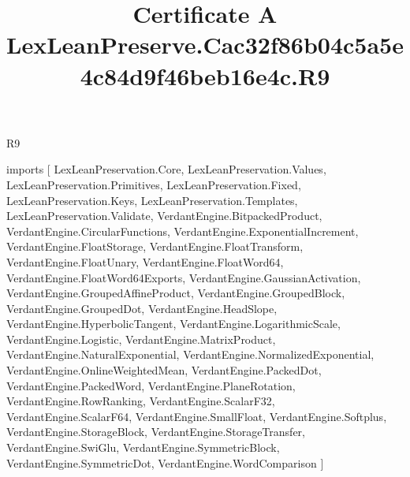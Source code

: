 \begin{lexlean}{R9}
\title{Certificate A LexLeanPreserve.Cac32f86b04c5a5e4c84d9f46beb16e4c.R9}
\begin{coremodule}
imports [
  LexLeanPreservation.Core,
  LexLeanPreservation.Values,
  LexLeanPreservation.Primitives,
  LexLeanPreservation.Fixed,
  LexLeanPreservation.Keys,
  LexLeanPreservation.Templates,
  LexLeanPreservation.Validate,
  VerdantEngine.BitpackedProduct,
  VerdantEngine.CircularFunctions,
  VerdantEngine.ExponentialIncrement,
  VerdantEngine.FloatStorage,
  VerdantEngine.FloatTransform,
  VerdantEngine.FloatUnary,
  VerdantEngine.FloatWord64,
  VerdantEngine.FloatWord64Exports,
  VerdantEngine.GaussianActivation,
  VerdantEngine.GroupedAffineProduct,
  VerdantEngine.GroupedBlock,
  VerdantEngine.GroupedDot,
  VerdantEngine.HeadSlope,
  VerdantEngine.HyperbolicTangent,
  VerdantEngine.LogarithmicScale,
  VerdantEngine.Logistic,
  VerdantEngine.MatrixProduct,
  VerdantEngine.NaturalExponential,
  VerdantEngine.NormalizedExponential,
  VerdantEngine.OnlineWeightedMean,
  VerdantEngine.PackedDot,
  VerdantEngine.PackedWord,
  VerdantEngine.PlaneRotation,
  VerdantEngine.RowRanking,
  VerdantEngine.ScalarF32,
  VerdantEngine.ScalarF64,
  VerdantEngine.SmallFloat,
  VerdantEngine.Softplus,
  VerdantEngine.StorageBlock,
  VerdantEngine.StorageTransfer,
  VerdantEngine.SwiGlu,
  VerdantEngine.SymmetricBlock,
  VerdantEngine.SymmetricDot,
  VerdantEngine.WordComparison
]


\end{coremodule}
\end{lexlean}
